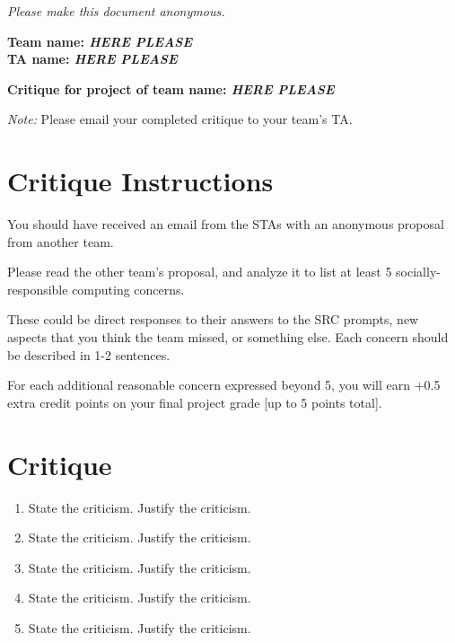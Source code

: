 \emph{Please make this document anonymous.}

\textbf{Team name: \emph{HERE PLEASE}}\\
\textbf{TA name: \emph{HERE PLEASE}}

\textbf{Critique for project of team name: \emph{HERE PLEASE}}

\emph{Note:} Please email your completed critique to your team's TA.

\section*{Critique Instructions}

You should have received an email from the STAs with an anonymous proposal from another team. 

Please read the other team's proposal, and analyze it to list at least 5 socially-responsible computing concerns. 

These could be direct responses to their answers to the SRC prompts, new aspects that you think the team missed, or something else. Each concern should be described in 1-2 sentences.

For each additional reasonable concern expressed beyond 5, you will earn +0.5 extra credit points on your final project grade [up to 5 points total].

\section*{Critique}

\begin{enumerate}
    \item State the criticism. Justify the criticism.
    \item State the criticism. Justify the criticism.
    \item State the criticism. Justify the criticism.
    \item State the criticism. Justify the criticism.
    \item State the criticism. Justify the criticism.
\end{enumerate}


